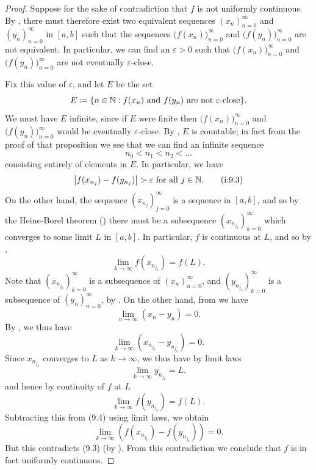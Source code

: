 \begin{proof}
  Suppose for the sake of contradiction that \(f\) is not uniformly continuous.
  By , there must therefore exist two equivalent sequences \((x_n)_{n = 0}^\infty\) and \((y_n)_{n = 0}^\infty\) in \([a, b]\) such that the sequences \(\big(f(x_n)\big)_{n = 0}^\infty\) and \(\big(f(y_n)\big)_{n = 0}^\infty\) are not equivalent.
  In particular, we can find an \(\varepsilon > 0\) such that \(\big(f(x_n)\big)_{n = 0}^\infty\) and \(\big(f(y_n)\big)_{n = 0}^\infty\) are not eventually \(\varepsilon\)-close.

  Fix this value of \(\varepsilon\), and let \(E\) be the set
  \[
    E \coloneqq \set{n \in \N : f(x_n) \text{ and } f(y_n) \text{ are not \(\varepsilon\)-close}}.
  \]
  We must have \(E\) infinite, since if \(E\) were finite then \(\big(f(x_n)\big)_{n = 0}^\infty\) and \(\big(f(y_n)\big)_{n = 0}^\infty\) would be eventually \(\varepsilon\)-close.
  By , \(E\) is countable;
  in fact from the proof of that proposition we see that we can find an infinite sequence
  \[
    n_0 < n_1 < n_2 < \dots
  \]
  consisting entirely of elements in \(E\).
  In particular, we have
  \[
    \left\lvert f(x_{n_j}) - f(y_{n_j})\right\rvert > \varepsilon \text{ for all } j \in \mathbb{N}. \tag{i:9.3}\label{i:eq 9.3}
  \]
  On the other hand, the sequence \((x_{n_j})_{j = 0}^\infty\) is a sequence in \([a, b]\), and so by the Heine-Borel theorem () there must be a subsequence \((x_{n_{j_k}})_{k = 0}^\infty\) which converges to some limit \(L\) in \([a, b]\).
  In particular, \(f\) is continuous at \(L\), and so by ,
  \[
    \lim_{k \to \infty} f(x_{n_{j_k}}) = f(L). \tag{i:9.4}\label{i:eq 9.4}
  \]
  Note that \((x_{n_{j_k}})_{k = 0}^\infty\) is a subsequence of \((x_n)_{n = 0}^\infty\), and \((y_{n_{j_k}})_{k = 0}^\infty\) is a subsequence of \((y_n)_{n = 0}^\infty\), by .
  On the other hand, from  we have
  \[
    \lim_{n \to \infty} (x_n - y_n) = 0.
  \]
  By , we thus have
  \[
    \lim_{k \to \infty} (x_{n_{j_k}} - y_{n_{j_k}}) = 0.
  \]
  Since \(x_{n_{j_k}}\) converges to \(L\) as \(k \to \infty\), we thus have by limit laws
  \[
    \lim_{k \to \infty} y_{n_{j_k}} = L.
  \]
  and hence by continuity of \(f\) at \(L\)
  \[
    \lim_{k \to \infty} f(y_{n_{j_k}}) = f(L).
  \]
  Subtracting this from (9.4) using limit laws, we obtain
  \[
    \lim_{k \to \infty} (f(x_{n_{j_k}}) - f(y_{n_{j_k}})) = 0.
  \]
  But this contradicts (9.3) (by ).
  From this contradiction we conclude that \(f\) is in fact uniformly continuous.
\end{proof}

